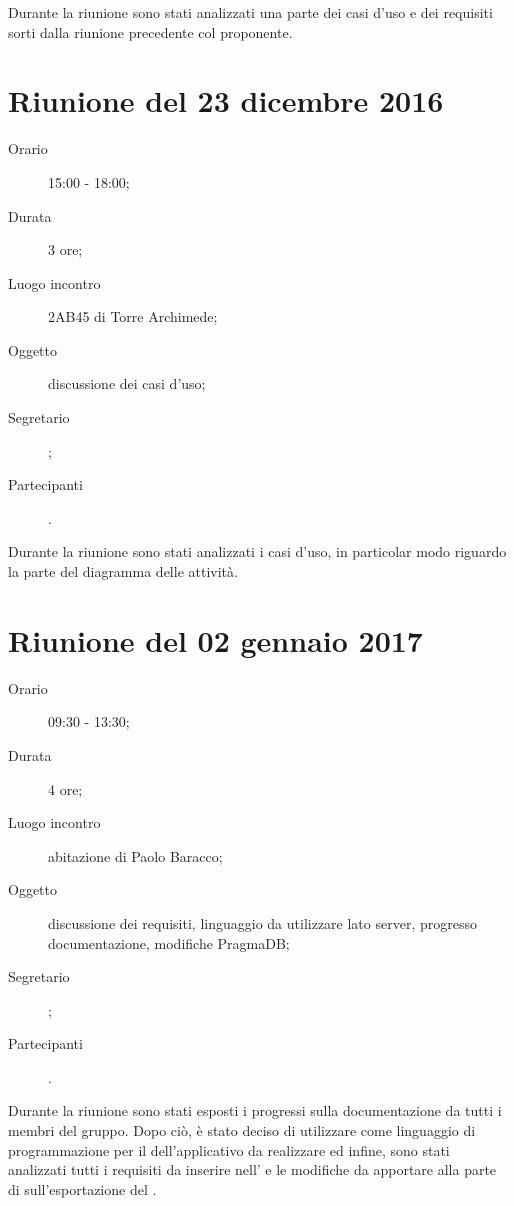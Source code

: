Durante la riunione sono stati analizzati una parte dei casi d'uso e dei requisiti sorti dalla riunione precedente col proponente.


\section{Riunione del 23 dicembre 2016}

\begin{description}
	\item[Orario] 15:00 - 18:00;
	\item[Durata] 3 ore;
	\item[Luogo incontro] 2AB45 di Torre Archimede; 
	\item[Oggetto] discussione dei casi d'uso;
	\item[Segretario] \PB; 
	\item[Partecipanti] \ALL.
\end{description}

Durante la riunione sono stati analizzati i casi d'uso, in particolar modo riguardo la parte del diagramma delle attività.

\section{Riunione del 02 gennaio 2017}

\begin{description}
	\item[Orario] 09:30 - 13:30;
	\item[Durata] 4 ore;
	\item[Luogo incontro] abitazione di Paolo Baracco; 
	\item[Oggetto] discussione dei requisiti, linguaggio da utilizzare lato server, progresso documentazione, modifiche PragmaDB;
	\item[Segretario] \PB; 
	\item[Partecipanti] \ALL.
\end{description}

Durante la riunione sono stati esposti i progressi sulla documentazione da tutti i membri del gruppo. Dopo ciò, è stato deciso di utilizzare  come linguaggio di programmazione per il  dell'applicativo da realizzare ed infine, sono stati analizzati tutti i requisiti da inserire nell'\AdR{} e le modifiche da apportare alla parte  di  sull'esportazione del \Glossario.

